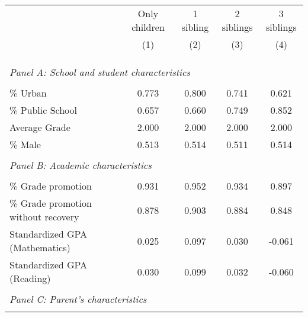 \makeatletter
{}
{
\makeatother
\begin{tabular}{lcccc}
\toprule
& Only children & 1 sibling & 2 siblings & 3 siblings  \\
\cmidrule(lr){2-2} \cmidrule(lr){3-3} \cmidrule(lr){4-4} \cmidrule(lr){5-5}
& (1) & (2) & (3) & (4)\\
\bottomrule
&  &  &  & \\
            &            &            &            &            \\
&  &  &   \\
\multicolumn{4}{l}{\textit{Panel A: School and student characteristics}} \\
            &            &            &            &            \\
\% Urban    &       0.773&       0.800&       0.741&       0.621\\
\% Public School&       0.657&       0.660&       0.749&       0.852\\
Average Grade&       2.000&       2.000&       2.000&       2.000\\
\% Male     &       0.513&       0.514&       0.511&       0.514\\
&  &  &   \\
\multicolumn{4}{l}{\textit{Panel B: Academic characteristics}} \\
            &            &            &            &            \\
\% Grade promotion&       0.931&       0.952&       0.934&       0.897\\
\% Grade promotion without recovery&       0.878&       0.903&       0.884&       0.848\\
Standardized GPA (Mathematics) &       0.025&       0.097&       0.030&      -0.061\\
Standardized GPA (Reading)&       0.030&       0.099&       0.032&      -0.060\\
&  &  &   \\
\multicolumn{4}{l}{\textit{Panel C: Parent's characteristics}} \\
            &            &            &            &            \\

\end{tabular}}
